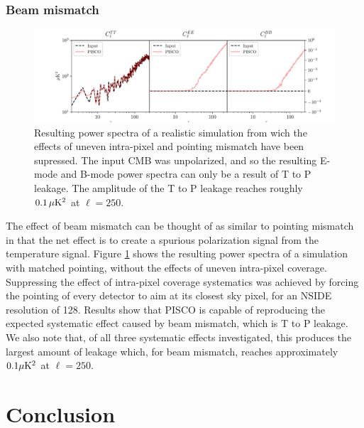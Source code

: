 \documentclass[a4paper,11pt]{article}
\begin{document}
\subsubsection{Beam mismatch}

\begin{figure}
	\centering
	\includegraphics[width=1\textwidth]{figures/unpolCMB_r0d00_CLASS_forcedPointing_mismatchedBeams_ellipticalBeams.pdf}
	\caption{Resulting power spectra of a realistic simulation from wich the effects of uneven intra-pixel and pointing mismatch have been supressed. The input CMB was unpolarized, and so the resulting E-mode and B-mode power spectra can only be a result of T to P leakage. The amplitude of the T to P leakage reaches roughly $0.1\, \mu\rm{K}^2$ at $\ell=250$.}
	\label{fig::pisco4class_beammismatch}
\end{figure}

The effect of beam mismatch can be thought of as similar to pointing mismatch in that the net effect is to create a spurious polarization signal from the temperature signal. Figure \ref{fig::pisco4class_beammismatch} shows the resulting power spectra of a simulation with matched pointing, without the effects of uneven intra-pixel coverage. Suppressing the effect of intra-pixel coverage systematics was achieved by forcing the pointing of every detector to aim at its closest sky pixel, for an NSIDE resolution of 128. Results show that PISCO is capable of reproducing the expected systematic effect caused by beam mismatch, which is T to P leakage. We also note that, of all three systematic effects investigated, this produces the largest amount of leakage which, for beam mismatch, reaches approximately $0.1 \mu\rm{K}^2$ at $\ell=250$. 

\section{Conclusion}
\label{sec::conclusions}
\end{document}
